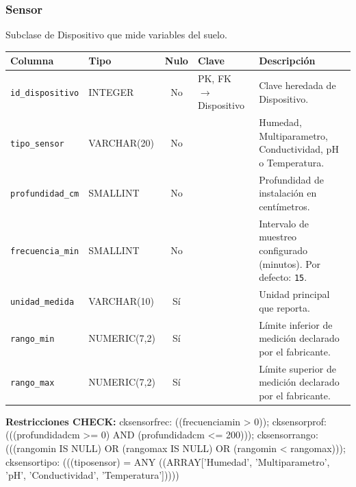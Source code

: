 \documentclass[11pt,letterpaper]{article}
\newcommand{\tbus}{\textunderscore\allowbreak}
\newcommand{\tb}[1]{{\ttfamily\let\_\tbus #1}}
\begin{document}
\subsubsection*{Sensor}
Subclase de Dispositivo que mide variables del suelo.
{\footnotesize
\begin{longtable}{>{\raggedright\arraybackslash}p{3.3cm}>{\raggedright\arraybackslash}p{2.5cm}c>{\raggedright\arraybackslash}p{2.2cm}>{\raggedright\arraybackslash}p{6.1cm}}
\toprule
\textbf{Columna} & \textbf{Tipo} & \textbf{Nulo} & \textbf{Clave} & \textbf{Descripción} \\
\midrule
\endhead
\texttt{id\_dispositivo} & INTEGER & No & PK, FK $\to$ Dispositivo & Clave heredada de Dispositivo. \\
\texttt{tipo\_sensor} & VARCHAR(20) & No &  & Humedad, Multiparametro, Conductividad, pH o Temperatura. \\
\texttt{profundidad\_cm} & SMALLINT & No &  & Profundidad de instalación en centímetros. \\
\texttt{frecuencia\_min} & SMALLINT & No &  & Intervalo de muestreo configurado (minutos). Por defecto: \texttt{15}. \\
\texttt{unidad\_medida} & VARCHAR(10) & Sí &  & Unidad principal que reporta. \\
\texttt{rango\_min} & NUMERIC(7,2) & Sí &  & Límite inferior de medición declarado por el fabricante. \\
\texttt{rango\_max} & NUMERIC(7,2) & Sí &  & Límite superior de medición declarado por el fabricante. \\
\bottomrule
\end{longtable}}
{\footnotesize\raggedright\textbf{Restricciones CHECK:} \tb{ck\_sensor\_frec}: \tb{((frecuencia\_min > 0))}; \tb{ck\_sensor\_prof}: \tb{(((profundidad\_cm >= 0) AND (profundidad\_cm <= 200)))}; \tb{ck\_sensor\_rango}: \tb{(((rango\_min IS NULL) OR (rango\_max IS NULL) OR (rango\_min < rango\_max)))}; \tb{ck\_sensor\_tipo}: \tb{(((tipo\_sensor) = ANY ((ARRAY['Humedad', 'Multiparametro', 'pH', 'Conductividad', 'Temperatura']))))}\par}
\medskip
\end{document}
